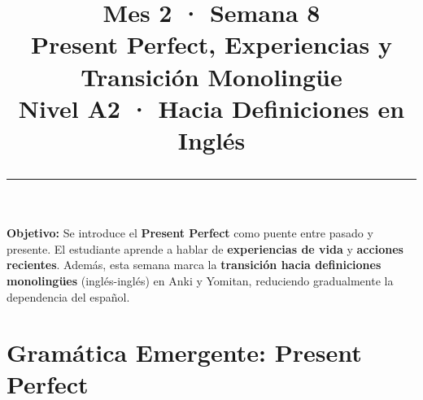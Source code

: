\documentclass[12pt,a4paper]{article}
\title{%
  \vspace{-1cm}
  {\Huge\bfseries\textcolor{mes2}{Mes 2 · Semana 8}}\\[0.3cm]
  {\Large Present Perfect, Experiencias y Transición Monolingüe}\\[0.2cm]
  {\large\color{grissuave} Nivel A2 · Hacia Definiciones en Inglés}\\[0.5cm]
  \rule{\textwidth}{1.5pt}
}
\author{}
\date{}
\begin{document}
\maketitle
\thispagestyle{empty}

\begin{cajanivel}
\textbf{Objetivo:} Se introduce el \textbf{Present Perfect} como puente entre pasado y presente. El estudiante aprende a hablar de \textbf{experiencias de vida} y \textbf{acciones recientes}. Además, esta semana marca la \textbf{transición hacia definiciones monolingües} (inglés-inglés) en Anki y Yomitan, reduciendo gradualmente la dependencia del español.
\end{cajanivel}

\section{Gramática Emergente: Present Perfect}
\end{document}
